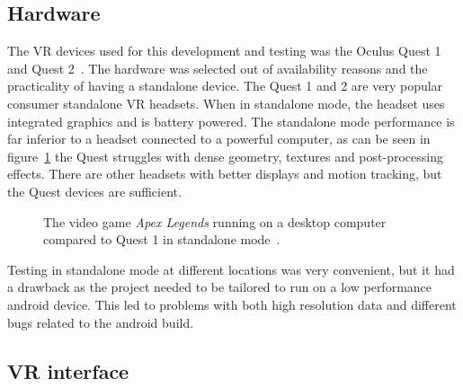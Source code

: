 \documentclass[a4paper]{report}
\begin{document}
\subsection{Hardware}
The VR devices used for this development and testing was the Oculus Quest 1 and Quest 2~\cite{noauthor_oculus_nodate}. The hardware was selected out of availability reasons and the practicality of having a standalone device.
The Quest 1 and 2 are very popular consumer standalone VR headsets. When in standalone mode, the headset uses integrated graphics and is battery powered. The standalone mode performance is far inferior to a headset connected to a powerful computer, as can be seen in figure~\ref{comp} the Quest struggles with dense geometry, textures and post-processing effects.
There are other headsets with better displays and motion tracking, but the Quest devices are sufficient.

\begin{figure}[h!]
    \centering

	\hfill
	\caption{The video game \emph{Apex Legends} running on a desktop computer compared to Quest 1 in standalone mode~\cite{tyriel_wood_-_vr_tech_oculus_2019}.}\label{comp}
  \small

\end{figure}
Testing in standalone mode at different locations was very convenient, but it had a drawback as the project needed to be tailored to run on a low performance android device. This led to problems with both high resolution data and different bugs related to the android build.

\subsection{VR interface}
\end{document}
